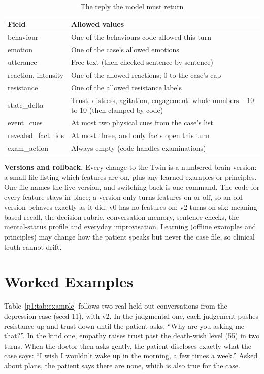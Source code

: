 \documentclass[journal]{IEEEtran}
\begin{document}
\begin{table}[t]
\caption{The reply the model must return}
\label{p1:tab:schema}
\centering
\scriptsize
\begin{tabularx}{\columnwidth}{@{}lY@{}}
\toprule
Field & Allowed values\\
\midrule
behaviour & One of the behaviours code allowed this turn\\
emotion & One of the case's allowed emotions\\
utterance & Free text (then checked sentence by sentence)\\
reaction, intensity & One of the allowed reactions; 0 to the case's cap\\
resistance & One of the allowed resistance labels\\
state\_delta & Trust, distress, agitation, engagement: whole numbers $-10$ to $10$ (then clamped by code)\\
event\_cues & At most two physical cues from the case's list\\
revealed\_fact\_ids & At most three, and only facts open this turn\\
exam\_action & Always empty (code handles examinations)\\
\bottomrule
\end{tabularx}
\end{table}

\textbf{Versions and rollback.} Every change to the Twin is a numbered brain version: a small file listing which features are on, plus any
learned examples or principles. One file names the live version, and switching back is one command. The code for every feature stays in place;
a version only turns features on or off, so an old version behaves exactly as it did. v0 has no features on; v2 turns on six: meaning-based
recall, the decision rubric, conversation memory, sentence checks, the mental-status profile and everyday improvisation. Learning (offline
examples and principles) may change how the patient speaks but never the case file, so clinical truth cannot drift.

\section{Worked Examples}
Table~\ref{p1:tab:example} follows two real held-out conversations from the depression case (seed 11), with v2. In the judgmental one, each
judgement pushes resistance up and trust down until the patient asks, ``Why are you asking me that?''. In the kind one, empathy raises trust past the death-wish level (55) in two turns. When the doctor then asks gently, the patient discloses exactly what the case says: ``I wish I
wouldn't wake up in the morning, a few times a week.'' Asked about plans, the patient says there are none, which is also true for the case.
\end{document}
